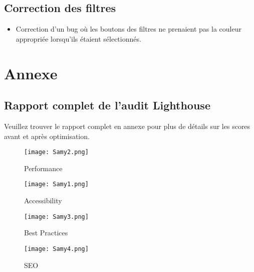 \subsection{Correction des filtres}
\begin{itemize}
    \item Correction d'un bug où les boutons des filtres ne prenaient pas la couleur appropriée lorsqu'ils étaient sélectionnés.
\end{itemize}

\newpage
\section*{Annexe}
\subsection*{Rapport complet de l’audit Lighthouse}
Veuillez trouver le rapport complet en annexe pour plus de détails sur les scores avant et après optimisation.

 \begin{figure}[h!] %
    \centering %
    \texttt{[image: Samy2.png]} %
    \caption{Performance} %
    \label{Samy2.png} %
    \end{figure}
    \newpage

     \begin{figure}[h!] %
    \centering %
    \texttt{[image: Samy1.png]} %
    \caption{Accessibility} %
    \label{Samy1.png} %
    \end{figure}
    \newpage

     \begin{figure}[h!] %
    \centering %
    \texttt{[image: Samy3.png]} %
    \caption{Best Practices} %
    \label{Samy3.png} %
    \end{figure}
    \newpage


    \begin{figure}[h!] %
    \centering %
    \texttt{[image: Samy4.png]} %
    \caption{SEO} %
    \label{Samy4.png} %
    \end{figure}
    \newpage

